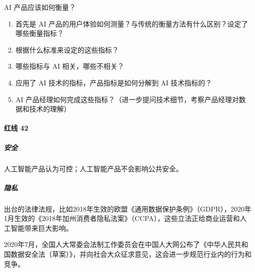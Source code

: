 \documentclass[letterpaper,10pt,english]{sphinxmanual}
\begin{document}
AI
产品应该如何衡量？%
\begin{footnote}[304]\sphinxAtStartFootnote
{}
%
\end{footnote}
\begin{enumerate}
%
\item {} 
首先是 AI
产品的用户体验如何测量？与传统的衡量方法有什么区别？设定了哪些衡量指标？

\item {} 
根据什么标准来设定的这些指标？

\item {} 
哪些指标与 AI 相关，哪些不相关？

\item {} 
应用了 AI 技术的指标，产品指标是如何分解到 AI 技术指标的？

\item {} 
AI
产品经理如何完成这些指标？（进一步提问技术细节，考察产品经理对数据和技术的理解）

\end{enumerate}


\paragraph{红线 42\sphinxfootnotemark[305]}
\label{\detokenize{chapter_introduction/AI_PM:id36}}%
\begin{footnotetext}[305]\sphinxAtStartFootnote
{}
%
\end{footnotetext}\ignorespaces 

\subparagraph{安全}
\label{\detokenize{chapter_introduction/AI_PM:id37}}
人工智能产品认为可控；人工智能产品不会影响公共安全。


\subparagraph{隐私}
\label{\detokenize{chapter_introduction/AI_PM:id38}}
出台的法律法规，比如2018年生效的欧盟《通用数据保护条例》（GDPR），2020年1月生效的《2018年加州消费者隐私法案》（CCPA），这些立法正给商业运营和人工智能带来巨大影响。

2020年7月，全国人大常委会法制工作委员会在中国人大网公布了《中华人民共和国数据安全法（草案）》，并向社会大众征求意见，这会进一步规范行业内的行为和竞争。
%
\begin{footnote}[306]\sphinxAtStartFootnote
{}
%
\end{footnote}
\end{document}
